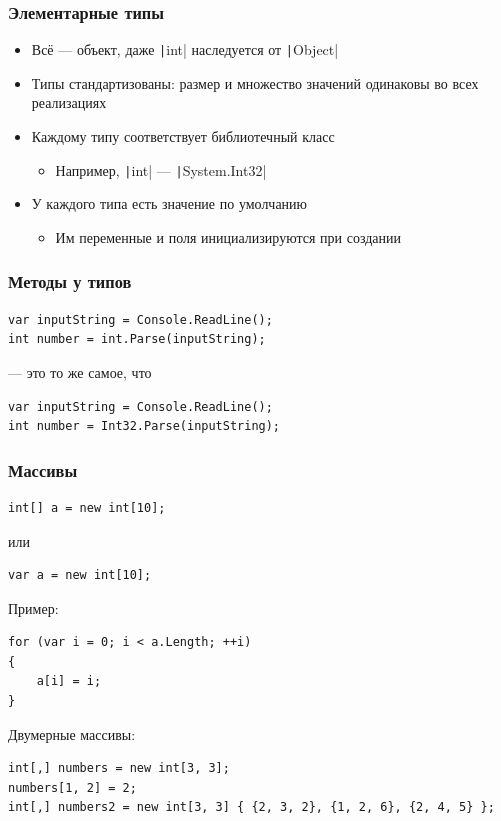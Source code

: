 \documentclass[xetex,mathserif,serif]{beamer}
\begin{document}
	\begin{frame}
		\frametitle{Элементарные типы}
		\begin{itemize}
			\item Всё --- объект, даже \texttt|int| наследуется от \texttt|Object|
			\item Типы стандартизованы: размер и множество значений одинаковы во всех реализациях
			\item Каждому типу соответствует библиотечный класс
			\begin{itemize}
				\item Например, \texttt|int| --- \texttt|System.Int32|
			\end{itemize}
			\item У каждого типа есть значение по умолчанию
			\begin{itemize}
				\item Им переменные и поля инициализируются при создании
			\end{itemize}
		\end{itemize}
	\end{frame}

	\begin{frame}[fragile]
		\frametitle{Методы у типов}
		\begin{verbatim}
var inputString = Console.ReadLine();
int number = int.Parse(inputString);
		\end{verbatim}
		--- это то же самое, что
		\begin{verbatim}
var inputString = Console.ReadLine();
int number = Int32.Parse(inputString);
		\end{verbatim}
	\end{frame}

	\begin{frame}[fragile]
		\frametitle{Массивы}
		\begin{verbatim}
int[] a = new int[10];
		\end{verbatim}
		или
		\begin{verbatim}
var a = new int[10];
		\end{verbatim}
		Пример:
		\begin{verbatim}
for (var i = 0; i < a.Length; ++i)
{
    a[i] = i;
}
		\end{verbatim}
		Двумерные массивы:
		\begin{verbatim}
int[,] numbers = new int[3, 3];
numbers[1, 2] = 2; 
int[,] numbers2 = new int[3, 3] { {2, 3, 2}, {1, 2, 6}, {2, 4, 5} };
		\end{verbatim}
	\end{frame}
\end{document}
